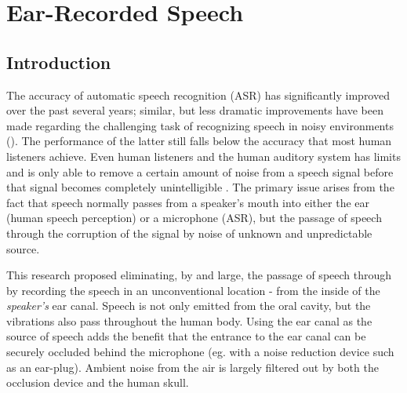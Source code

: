 % 
% 
% 



\chapter{Ear-Recorded Speech\label{chapter2}}


\section{Introduction}

The accuracy of automatic speech recognition (ASR) has significantly improved over the past several years; similar, but less dramatic improvements have been made regarding the challenging task of recognizing speech in noisy environments (\cite{zhang:17}).  The performance of the latter still falls below the accuracy that most human listeners achieve.  Even human listeners and the human auditory system has limits and is only able to remove a certain amount of noise from a speech signal before that signal becomes completely unintelligible \DIFaddbegin {}\DIFaddend .  The primary issue arises from the fact that speech normally passes from a speaker's mouth into either the ear (human speech perception) or a microphone (ASR), but the passage of speech through the \DIFdelbegin {}\DIFdelend \DIFaddbegin {}\DIFaddend corruption of the signal by noise of unknown \DIFdelbegin {}\DIFdelend \DIFaddbegin {}\DIFaddend and unpredictable source.  

This research proposed eliminating, by and large, the passage of speech through \DIFdelbegin {}\DIFdelend \DIFaddbegin {}\DIFaddend by recording the speech in an unconventional location - from the inside of the \textit{speaker's} ear canal.  Speech is not only emitted from the oral cavity, but the vibrations also pass throughout the human body.  Using the ear canal as the source of speech adds the benefit that the entrance to the ear canal can be securely occluded behind the microphone (eg. with a noise reduction device such as an ear-plug).  Ambient noise from the air is largely filtered out by both the occlusion device and the human skull.

